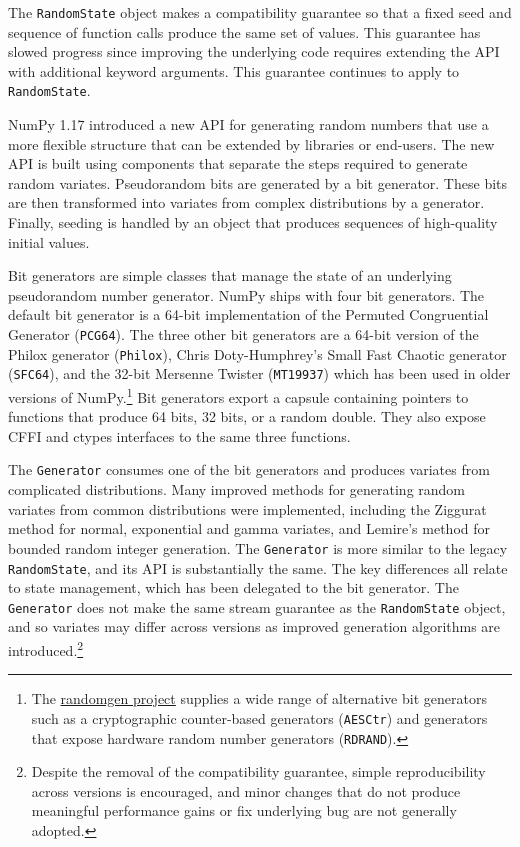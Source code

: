 \documentclass[fleqn,10pt]{wlscirep}
\newcommand{\code}[1]{\texttt{#1}}
\begin{document}
The \code{RandomState} object makes a compatibility guarantee so that a fixed
seed and sequence of function calls produce the same set of values. This
guarantee has slowed progress since improving the underlying code requires
extending the API with additional keyword arguments. This guarantee continues to
apply to \code{RandomState}. 

NumPy 1.17 introduced a new API for generating random numbers that use a more
flexible structure that can be extended by libraries or end-users. The new API
is built using components that separate the steps required to generate random
variates. Pseudorandom bits are generated by a bit generator. These bits are
then transformed into variates from complex distributions by a generator.
Finally, seeding is handled by an object that produces sequences of high-quality
initial values.

Bit generators are simple classes that manage the state of an underlying
pseudorandom number generator. NumPy ships with four bit generators. The default
bit generator is a 64-bit implementation of the Permuted Congruential Generator
\cite{pcg64} (\code{PCG64}). The three other bit generators are a 64-bit version
of the Philox generator\cite{random123} (\code{Philox}), Chris Doty-Humphrey's
Small Fast Chaotic generator\cite{practrand} (\code{SFC64}), and the 32-bit
Mersenne Twister\cite{mt19937} (\code{MT19937}) which has been used in older
versions of NumPy.\footnote{The
\href{https://github.com/bashtage/randomgen}{randomgen project} supplies a wide
range of alternative bit generators such as a cryptographic counter-based
generators (\code{AESCtr}) and generators that expose hardware random number
generators (\code{RDRAND})\cite{randomgen}.} Bit generators export a capsule
containing pointers to functions that produce 64 bits, 32 bits, or a random
double. They also expose CFFI and ctypes interfaces to the same three functions.

The \code{Generator} consumes one of the bit generators and produces variates
from complicated distributions. Many improved methods for generating random
variates from common distributions were implemented, including the Ziggurat
method for normal, exponential and gamma variates\cite{ziggurat}, and Lemire's
method for bounded random integer generation\cite{lemire}. The \code{Generator}
is more similar to the legacy \code{RandomState}, and its API is substantially
the same. The key differences all relate to state management, which has been
delegated to the bit generator. The \code{Generator} does not make the same
stream guarantee as the \code{RandomState} object, and so variates may differ
across versions as improved generation algorithms are
introduced.\footnote{Despite the removal of the compatibility guarantee, simple
reproducibility across versions is encouraged, and minor changes that do not
produce meaningful performance gains or fix underlying bug are not generally
adopted.}
\end{document}
